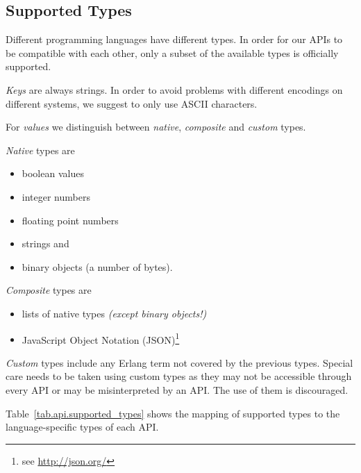 \subsection{Supported Types}

Different programming languages have different types. In order for our APIs
to be compatible with each other, only a subset of the available types is
officially supported.

\emph{Keys} are always strings. In order to avoid problems with different
encodings on different systems, we suggest to only use ASCII characters.

For \emph{values} we distinguish between \emph{native}, \emph{composite}
and \emph{custom} types.

\emph{Native} types are
\begin{itemize}
  \item boolean values
  \item integer numbers
  \item floating point numbers
  \item strings and
  \item binary objects (a number of bytes).
\end{itemize}

\emph{Composite} types are
\begin{itemize}
  \item lists of native types \emph{(except binary objects!)}
  \item JavaScript Object Notation (JSON)\footnote{see \url{http://json.org/}}
\end{itemize}

\emph{Custom} types include any Erlang term not covered by the previous types.
Special care needs to be taken using custom types as they may not be accessible
through every API or may be misinterpreted by an API. The use of them is
discouraged.

Table~\ref{tab.api.supported_types} shows the mapping of supported types to the
language-specific types of each API.

